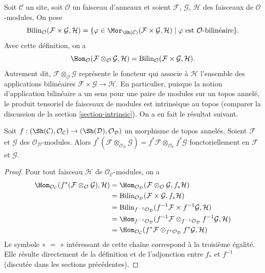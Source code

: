 \noindent
Soit $\mathcal{C}$ un site, soit $\mathcal{O}$ un faisceau d'anneaux et soient
$\mathcal{F}$, $\mathcal{G}$, $\mathcal{H}$ des faisceaux de
$\mathcal{O}$-modules. On pose
$$
\text{Bilin}_\mathcal{O}(\mathcal{F} \times \mathcal{G}, \mathcal{H})
=
\{\varphi \in
\Mor_{\Sh(\mathcal{C})}(
\mathcal{F} \times \mathcal{G}, \mathcal{H}) \mid
\varphi \text{ est }\mathcal{O}\text{-bilinéaire}\}.
$$
Avec cette définition, on a
$$
\Hom_\mathcal{O}
(\mathcal{F} \otimes_\mathcal{O} \mathcal{G}, \mathcal{H})
=
\text{Bilin}_\mathcal{O}(\mathcal{F} \times \mathcal{G}, \mathcal{H}).
$$
Autrement dit, $\mathcal{F} \otimes_\mathcal{O} \mathcal{G}$ représente le
foncteur qui associe à $\mathcal{H}$ l'ensemble des applications bilinéaires
$\mathcal{F} \times \mathcal{G} \to \mathcal{H}$.
En particulier, puisque la notion d'application bilinéaire a un sens pour
une paire de modules sur un topos annelé, le produit tensoriel de faisceaux de
modules est intrinsèque au topos (comparer la discussion de la
section \ref{section-intrinsic}). On a en fait le résultat suivant.

\begin{lemma}
\label{lemma-tensor-product-pullback}
Soit $f : (\Sh(\mathcal{C}), \mathcal{O}_\mathcal{C})
\to (\Sh(\mathcal{D}), \mathcal{O}_\mathcal{D})$ un morphisme de topos
annelés. Soient $\mathcal{F}$ et $\mathcal{G}$ des
$\mathcal{O}_\mathcal{D}$-modules. Alors
$f^*(\mathcal{F} \otimes_{\mathcal{O}_\mathcal{D}} \mathcal{G})
= f^*\mathcal{F} \otimes_{\mathcal{O}_\mathcal{C}} f^*\mathcal{G}$
fonctoriellement en $\mathcal{F}$ et $\mathcal{G}$.
\end{lemma}

\begin{proof}
Pour tout faisceau $\mathcal{H}$ de $\mathcal{O}_\mathcal{C}$-modules, on a
\begin{align*}
\Hom_{\mathcal{O}_\mathcal{C}}(
f^*(\mathcal{F} \otimes_\mathcal{O} \mathcal{G}), \mathcal{H})
& =
\Hom_{\mathcal{O}_\mathcal{D}}(
\mathcal{F} \otimes_\mathcal{O} \mathcal{G}, f_*\mathcal{H}) \\
& =
\text{Bilin}_{\mathcal{O}_\mathcal{D}}(
\mathcal{F} \times \mathcal{G}, f_*\mathcal{H}) \\
& =
\text{Bilin}_{f^{-1}\mathcal{O}_\mathcal{D}}(
f^{-1}\mathcal{F} \times f^{-1}\mathcal{G}, \mathcal{H}) \\
& =
\Hom_{f^{-1}\mathcal{O}_\mathcal{D}}(
f^{-1}\mathcal{F} \otimes_{f^{-1}\mathcal{O}_\mathcal{D}} f^{-1}\mathcal{G},
\mathcal{H}) \\
& =
\Hom_{\mathcal{O}_\mathcal{C}}(
f^*\mathcal{F} \otimes_{f^*\mathcal{O}_\mathcal{D}} f^*\mathcal{G},
\mathcal{H})
\end{align*}
Le symbole « $=$ » intéressant de cette chaîne correspond à la
troisième égalité. Elle résulte
directement de la définition et de l'adjonction entre $f_*$ et $f^{-1}$
(discutée dans les sections précédentes).
\end{proof}

